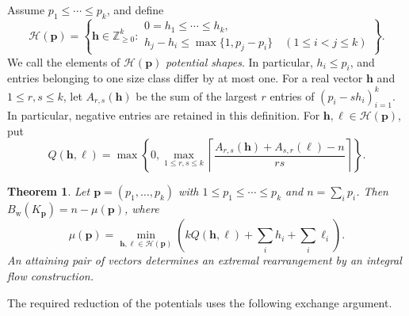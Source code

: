 \documentclass[10pt,a4paper]{amsart}
\numberwithin{equation}{section}
\newtheorem{theorem}{Theorem}[section]
\theoremstyle{definition}
\theoremstyle{remark}
\begin{document}
Assume $p_1\le\cdots\le p_k$, and define
\begin{equation}\label{eq:mp:shapes}
 \mathcal H(\mathbf p)=\left\{\mathbf h\in\mathbb Z_{\ge0}^{k}:
 \begin{array}{l}
 0=h_1\le\cdots\le h_k,\\
 h_j-h_i\le\max\{1,p_j-p_i\}\quad(1\le i<j\le k)
 \end{array}\right\}.
\end{equation}
We call the elements of $\mathcal H(\mathbf p)$ \emph{potential shapes}.
In particular, $h_i\le p_i$, and entries belonging to one size class
differ by at most one.
For a real vector $\mathbf h$ and $1\le r,s\le k$, let
$A_{r,s}(\mathbf h)$ be the sum of the largest $r$ entries of
$(p_i-sh_i)_{i=1}^k$. In particular, negative entries are retained in
this definition. For $\mathbf h,\boldsymbol\ell\in\mathcal H(\mathbf p)$,
put
\begin{equation}\label{eq:mp:weak-Q}
 Q(\mathbf h,\boldsymbol\ell)=
 \max\left\{0,\max_{1\le r,s\le k}
 \left\lceil\frac{A_{r,s}(\mathbf h)+A_{s,r}(\boldsymbol\ell)-n}{rs}
 \right\rceil\right\}.
\end{equation}

\begin{theorem}\label{thm:mp:weak}
Let $\mathbf p=(p_1,\ldots,p_k)$ with $1\le p_1\le\cdots\le p_k$
and $n=\sum_i p_i$. Then $B_{\mathrm w}(K_{\mathbf p})=n-\mu(\mathbf p)$,
where
\begin{equation}\label{eq:mp:weak}
 \mu(\mathbf p)=
 \min_{\mathbf h,\boldsymbol\ell\in\mathcal H(\mathbf p)}
 \left(kQ(\mathbf h,\boldsymbol\ell)+\sum_i h_i+\sum_i\ell_i\right).
\end{equation}
An attaining pair of vectors determines an extremal rearrangement by
an integral flow construction.
\end{theorem}

The required reduction of the potentials uses the following exchange
argument.
\end{document}
